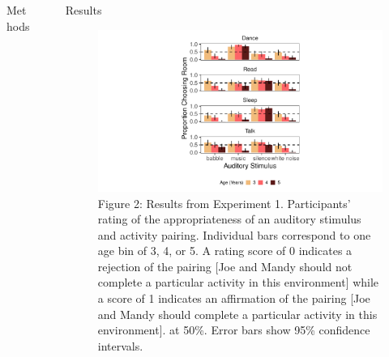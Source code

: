 \documentclass[final]{beamer}
\newlength{\sepwidth}
\newlength{\colwidth}
\newcommand{\separatorcolumn}{\begin{column}{\sepwidth}\end{column}}
\begin{document}
\begin{frame}[t]
\begin{columns}[t]
\begin{column}{\colwidth}
\begin{block}{Methods}
\begin{figure}
\begin{minipage}[t]{0.18\linewidth}
        \includegraphics[width=1.5in, height=1.75in]{figures/terb.png}
        \caption{Talk}
      \end{minipage}
    \end{figure}
    
  \end{block}

\end{column}

\separatorcolumn

\begin{column}{\colwidth}

  \begin{block}{Results}

    \begin{figure}
      \includegraphics[width = 9in]{../writeup/figs/figure3b_withedits.pdf}
      \caption{Figure 2: Results from Experiment 1. Participants’ rating of the appropriateness of an auditory stimulus and activity pairing. Individual bars correspond to one age bin of 3, 4, or 5. A rating score of 0 indicates a rejection of the pairing [Joe and Mandy should not complete a particular activity in this environment] while a score of 1 indicates an affirmation of the pairing [Joe and
      Mandy should complete a particular activity in this environment]. at 50\%. Error bars show 95\% confidence intervals.}
    \end{figure}


\end{block}
\end{column}
\end{columns}
\end{frame}
\end{document}

